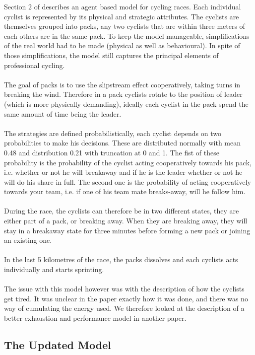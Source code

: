 \documentclass[10pt, a4paper]{report}
\begin{document}
Section 2 of \cite{AgentModel} describes an agent based model for cycling races. Each individual cyclist is represented by its physical and strategic attributes. The cyclists are themselves grouped into packs, any two cyclists that are within three meters of each others are in the same pack. To keep the model manageable, simplifications of the real world had to be made (physical as well as behavioural). In spite of those simplifications, the model still captures the principal elements of professional cycling. \\\\
The goal of packs is to use the slipstream effect cooperatively, taking turns in breaking the wind. Therefore in a pack cyclists rotate to the position of leader (which is more physically demanding), ideally each cyclist in the pack spend the same amount of time being the leader.\\\\
The strategies are defined probabilistically, each cyclist depends on two probabilities to make his decisions. These are distributed normally with mean 0.48 and distribution 0.21 with truncation at 0 and 1. The fist of these probability is the probability of the cyclist acting cooperatively towards his pack, i.e. whether or not he will breakaway and if he is the leader whether or not he will do his share in full. The second one is the probability of acting cooperatively towards your team, i.e. if one of his team mate breaks-away, will he follow him. \\\\
During the race, the cyclists can therefore be in two different states, they are either part of a pack, or breaking away. When they are breaking away, they will stay in a breakaway state for three minutes before forming a new pack or joining an existing one.
\\\\
In the last 5 kilometres of the race, the packs dissolves and each cyclists acts individually and starts sprinting. \\\\
The issue with this model however was with the description of how the cyclists get tired. It was unclear in the paper exactly how it was done, and there was no way of cumulating the energy used. We therefore looked at the description of a better exhaustion and performance model in another paper.

\subsection{The Updated Model}\label{subsec:updmodel}
\end{document}
